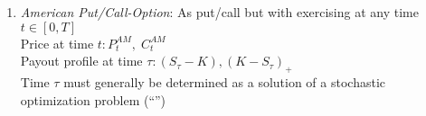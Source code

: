 \begin{enumerate}
\begin{itemize}
		\item \emph{Call}:
		\begin{align*}
		C_T := \begin{cases}
		S_T - K &\quad S_T \ge K\\
		0 &\quad S_T < K
		\end{cases} = (S_T - K)_+ %
		\end{align*}
		\begin{*remark}
			\begin{align*}
			X_+ &= \max(X,0)\quad X_+ - X__ = X\\
			X__ &= \min(X,0)\quad X_+ + X__ = \abs{X}
			\end{align*}
          	Image: (hockey stick function)
		\end{*remark}
		\item \emph{Put}:
		\begin{align*}
		P_t = \begin{cases}
		0 &\quad S_T \ge K\\
		K-S_T &\quad S_t < K
		\end{cases} = (K-S_T)_+
		\end{align*}
		Bild: ``inversed'' hockey stick function 
	\end{itemize}
	\item \emph{American Put/Call-Option}: As put/call but with exercising at any time $t \in [0,T]$\\
	Price at time $t\colon P_t^{AM}, \; C_t^{AM}$\\
	Payout profile at time $\tau\colon (S_{\tau}-K), (K-S_{\tau})_+$\\
	Time $\tau$ must generally be determined as a solution of a stochastic optimization problem (``'')
\end{enumerate}
